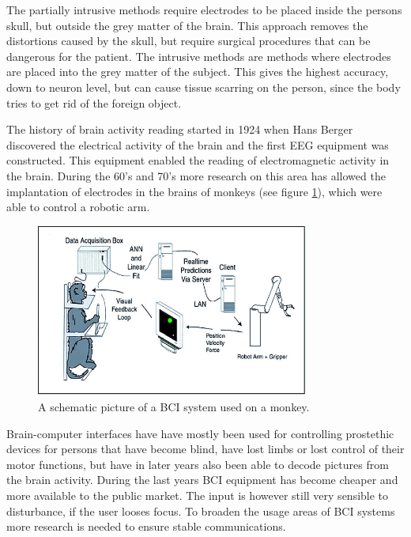 The partially intrusive methods require electrodes to be placed inside the persons skull, but outside the grey matter of the brain. This approach removes the distortions caused by the skull, but require surgical procedures that can be dangerous for the patient. The intrusive methods are methods where electrodes are placed into the grey matter of the subject. This gives the highest accuracy, down to neuron level, but can cause tissue scarring on the person, since the body tries to get rid of the foreign object.

The history of brain activity reading started in 1924 when Hans Berger discovered the electrical activity of the brain and the first EEG equipment was constructed\cite{haas2003hans}. This equipment enabled the reading of electromagnetic activity in the brain. During the 60's and 70's more research on this area has allowed the implantation of electrodes in the brains of monkeys (see figure \ref{apa}), which were able to control a robotic arm\cite{GeorgopoulosLuritoPetridesEtAl89}\cite{lebedev2005cortical}. 

\begin{figure}[]
\includegraphics[width=0.8\textwidth] {bilder/apa.jpg}
\caption{A schematic picture of a BCI system used on a monkey.}
\label{apa}
\end{figure}
\nocite{apa}

Brain-computer interfaces have have mostly been used for controlling prostethic devices for persons that have become blind, have lost limbs or lost control of their motor functions\cite{lebedev2006brain}, but have in later years also been able to decode pictures from the brain activity\cite{miyawaki2008visual}.
During the last years BCI equipment has become cheaper and more available to the public market\cite{legobrain}. The input is however still very sensible to disturbance, if the user looses focus. To broaden the usage areas of BCI systems more research is needed to ensure stable communications.

